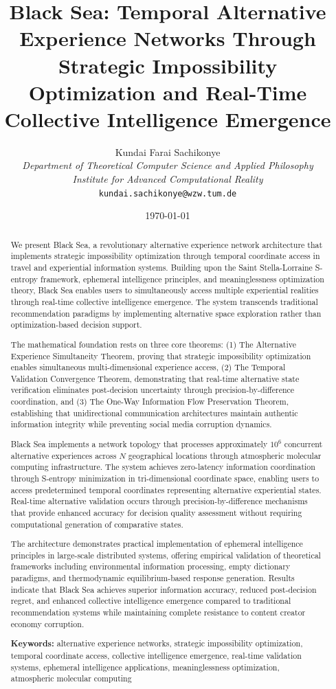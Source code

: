 \documentclass[12pt,a4paper]{article}
\title{\textbf{Black Sea: Temporal Alternative Experience Networks Through Strategic Impossibility Optimization and Real-Time Collective Intelligence Emergence}}
\author{
Kundai Farai Sachikonye\\
\textit{Department of Theoretical Computer Science and Applied Philosophy}\\
\textit{Institute for Advanced Computational Reality}\\
\texttt{kundai.sachikonye@wzw.tum.de}
}
\date{\today}
\begin{document}
\maketitle

\begin{abstract}
We present Black Sea, a revolutionary alternative experience network architecture that implements strategic impossibility optimization through temporal coordinate access in travel and experiential information systems. Building upon the Saint Stella-Lorraine S-entropy framework, ephemeral intelligence principles, and meaninglessness optimization theory, Black Sea enables users to simultaneously access multiple experiential realities through real-time collective intelligence emergence. The system transcends traditional recommendation paradigms by implementing alternative space exploration rather than optimization-based decision support.

The mathematical foundation rests on three core theorems: (1) The Alternative Experience Simultaneity Theorem, proving that strategic impossibility optimization enables simultaneous multi-dimensional experience access, (2) The Temporal Validation Convergence Theorem, demonstrating that real-time alternative state verification eliminates post-decision uncertainty through precision-by-difference coordination, and (3) The One-Way Information Flow Preservation Theorem, establishing that unidirectional communication architectures maintain authentic information integrity while preventing social media corruption dynamics.

Black Sea implements a network topology that processes approximately $10^6$ concurrent alternative experiences across $N$ geographical locations through atmospheric molecular computing infrastructure. The system achieves zero-latency information coordination through S-entropy minimization in tri-dimensional coordinate space, enabling users to access predetermined temporal coordinates representing alternative experiential states. Real-time alternative validation occurs through precision-by-difference mechanisms that provide enhanced accuracy for decision quality assessment without requiring computational generation of comparative states.

The architecture demonstrates practical implementation of ephemeral intelligence principles in large-scale distributed systems, offering empirical validation of theoretical frameworks including environmental information processing, empty dictionary paradigms, and thermodynamic equilibrium-based response generation. Results indicate that Black Sea achieves superior information accuracy, reduced post-decision regret, and enhanced collective intelligence emergence compared to traditional recommendation systems while maintaining complete resistance to content creator economy corruption.

\textbf{Keywords:} alternative experience networks, strategic impossibility optimization, temporal coordinate access, collective intelligence emergence, real-time validation systems, ephemeral intelligence applications, meaninglessness optimization, atmospheric molecular computing
\end{abstract}
\end{document}
